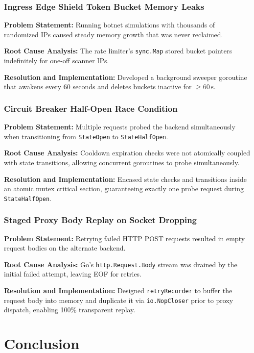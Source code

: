 \documentclass[12pt,openany]{report}
\begin{document}
\subsection{Ingress Edge Shield Token Bucket Memory Leaks}
\textbf{Problem Statement:} Running botnet simulations with thousands of randomized IPs caused steady memory growth that was never reclaimed.

\textbf{Root Cause Analysis:} The rate limiter's \texttt{sync.Map} stored bucket pointers indefinitely for one-off scanner IPs.

\textbf{Resolution and Implementation:} Developed a background sweeper goroutine that awakens every 60 seconds and deletes buckets inactive for $\ge 60\,\text{s}$.

\subsection{Circuit Breaker Half-Open Race Condition}
\textbf{Problem Statement:} Multiple requests probed the backend simultaneously when transitioning from \texttt{StateOpen} to \texttt{StateHalfOpen}.

\textbf{Root Cause Analysis:} Cooldown expiration checks were not atomically coupled with state transitions, allowing concurrent goroutines to probe simultaneously.

\textbf{Resolution and Implementation:} Encased state checks and transitions inside an atomic mutex critical section, guaranteeing exactly one probe request during \texttt{StateHalfOpen}.

\subsection{Staged Proxy Body Replay on Socket Dropping}
\textbf{Problem Statement:} Retrying failed HTTP POST requests resulted in empty request bodies on the alternate backend.

\textbf{Root Cause Analysis:} Go's \texttt{http.Request.Body} stream was drained by the initial failed attempt, leaving EOF for retries.

\textbf{Resolution and Implementation:} Designed \texttt{retryRecorder} to buffer the request body into memory and duplicate it via \texttt{io.NopCloser} prior to proxy dispatch, enabling 100\% transparent replay.


\chapter{Conclusion}
\end{document}
